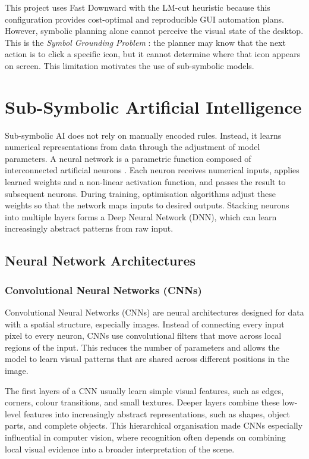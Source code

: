 This project uses Fast Downward with the LM-cut heuristic because this configuration provides cost-optimal and reproducible GUI automation plans. However, symbolic planning alone cannot perceive the visual state of the desktop. This is the \textit{Symbol Grounding Problem} \cite{Harnad1990}: the planner may know that the next action is to click a specific icon, but it cannot determine where that icon appears on screen. This limitation motivates the use of sub-symbolic models.

\section{Sub-Symbolic Artificial Intelligence}
\label{sec:sub-symbolic_ai}

Sub-symbolic AI does not rely on manually encoded rules. Instead, it learns numerical representations from data through the adjustment of model parameters. A neural network is a parametric function composed of interconnected artificial neurons \cite{Rosenblatt1958}. Each neuron receives numerical inputs, applies learned weights and a non-linear activation function, and passes the result to subsequent neurons. During training, optimisation algorithms adjust these weights so that the network maps inputs to desired outputs. Stacking neurons into multiple layers forms a Deep Neural Network (DNN), which can learn increasingly abstract patterns from raw input.

\subsection{Neural Network Architectures}
\label{subsec:nn_architectures}

\subsubsection{Convolutional Neural Networks (CNNs)}

Convolutional Neural Networks (CNNs) \cite{LeCun1998} are neural architectures designed for data with a spatial structure, especially images. Instead of connecting every input pixel to every neuron, CNNs use convolutional filters that move across local regions of the input. This reduces the number of parameters and allows the model to learn visual patterns that are shared across different positions in the image.

The first layers of a CNN usually learn simple visual features, such as edges, corners, colour transitions, and small textures. Deeper layers combine these low-level features into increasingly abstract representations, such as shapes, object parts, and complete objects. This hierarchical organisation made CNNs especially influential in computer vision, where recognition often depends on combining local visual evidence into a broader interpretation of the scene.

